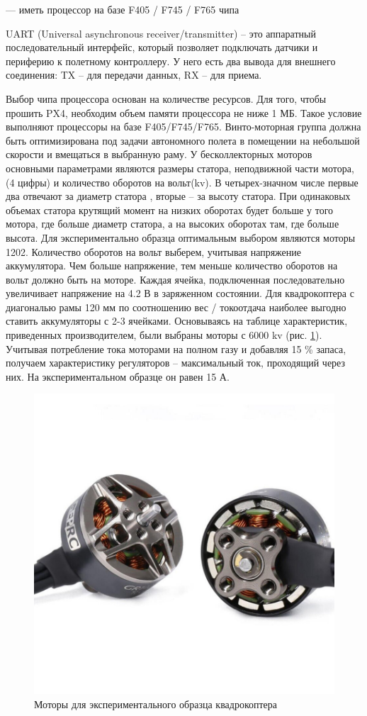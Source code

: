 --- иметь процессор на базе F405 / F745 / F765 чипа

UART (Universal asynchronous receiver/transmitter) -- это аппаратный последовательный интерфейс, который позволяет подключать датчики и периферию к полетному контроллеру. У него есть два вывода для внешнего соединения: TX -- для передачи данных, RX -- для приема.

Выбор чипа процессора основан на количестве ресурсов. Для того, чтобы прошить PX4, необходим объем памяти процессора не ниже 1 МБ. Такое условие выполняют процессоры на базе F405/F745/F765.
Винто-моторная группа должна быть оптимизирована под задачи автономного полета в помещении на небольшой скорости и вмещаться в выбранную раму. У бесколлекторных моторов основными параметрами являются размеры статора, неподвижной части мотора, (4 цифры) и количество оборотов на вольт(kv). В четырех-значном числе первые два отвечают за диаметр статора , вторые -- за высоту статора. При одинаковых объемах статора крутящий момент на низких оборотах будет больше у того мотора, где больше диаметр статора, а на высоких оборотах там, где больше высота. Для экспериментально образца оптимальным выбором являются моторы 1202. Количество оборотов на вольт выберем, учитывая напряжение аккумулятора. Чем больше напряжение, тем меньше количество оборотов на вольт должно быть на моторе. Каждая ячейка, подключенная последовательно увеличивает напряжение на 4.2 В в заряженном состоянии. Для квадрокоптера с диагональю рамы 120 мм по соотношению вес / токоотдача наиболее выгодно ставить аккумуляторы с 2-3 ячейками. Основываясь на таблице характеристик, приведенных производителем, были выбраны моторы с 6000 kv (рис. \ref{fig:motor}).
Учитывая потребление тока моторами на полном газу и добавляя 15 \% запаса, получаем характеристику регуляторов -- максимальный ток, проходящий через них. На экспериментальном образце он равен 15 А.
\begin{figure}[H]
	\centering
	\includegraphics[width=0.5\linewidth]{pics/motor}
	\caption{Моторы для экспериментального образца квадрокоптера
	}
	\label{fig:motor} %
\end{figure}
